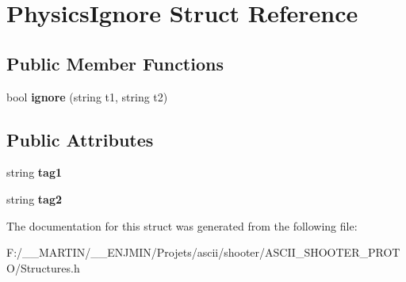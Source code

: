 \hypertarget{struct_physics_ignore}{}\section{Physics\+Ignore Struct Reference}
\label{struct_physics_ignore}
\subsection*{Public Member Functions}
\begin{DoxyCompactItemize}
\item 
\hypertarget{struct_physics_ignore_a4992567e145c907dc22e9594fdac4c84}{}\label{struct_physics_ignore_a4992567e145c907dc22e9594fdac4c84} 
bool {\bfseries ignore} (string t1, string t2)
\end{DoxyCompactItemize}
\subsection*{Public Attributes}
\begin{DoxyCompactItemize}
\item 
\hypertarget{struct_physics_ignore_a8c2d4c55ba67b5c4d5c97a97ca815553}{}\label{struct_physics_ignore_a8c2d4c55ba67b5c4d5c97a97ca815553} 
string {\bfseries tag1}
\item 
\hypertarget{struct_physics_ignore_ab951c2347a6c7442ee1baa820330d299}{}\label{struct_physics_ignore_ab951c2347a6c7442ee1baa820330d299} 
string {\bfseries tag2}
\end{DoxyCompactItemize}


The documentation for this struct was generated from the following file\+:\begin{DoxyCompactItemize}
\item 
F\+:/\+\_\+\+\_\+\+M\+A\+R\+T\+I\+N/\+\_\+\+\_\+\+E\+N\+J\+M\+I\+N/\+Projets/ascii/shooter/\+A\+S\+C\+I\+I\+\_\+\+S\+H\+O\+O\+T\+E\+R\+\_\+\+P\+R\+O\+T\+O/Structures.\+h\end{DoxyCompactItemize}
